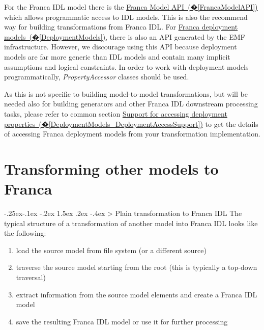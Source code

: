 \documentclass[a4paper,10pt]{scrreprt}
\makeatletter
\renewcommand\subsection{\medskip\@startsection{subsection}{2}{\z@}%
  {-.25ex\@plus -.1ex \@minus -.2ex}%
  {1.5ex \@plus .2ex \@minus -.4ex}%
  {\ifnum \scr@compatibility>\@nameuse{scr@v@2.96}\relax
    \setlength{\parfillskip}{\z@ plus 1fil}\fi
    \raggedsection\normalfont\sectfont\nobreak\size@subsection
  }%
}
\newlength{\XdocItemIndent}
\makeatother
\begin{document}
For the Franca IDL model there is the \hyperref[FrancaModelAPI]{Franca Model API~(�\ref*{FrancaModelAPI})} which allows
programmatic access to IDL models. This is also the recommend way for building transformations
from Franca IDL.
For \hyperref[DeploymentModels]{Franca deployment models~(�\ref*{DeploymentModels})}, there is also an API generated by the
EMF infrastructure. However, we discourage using this API because deployment models are far more
generic than IDL models and contain many implicit assumptions and logical constraints. 
In order to work with deployment models programmatically, \textit{PropertyAccessor} classes
should be used.

As this is not specific to building model-to-model transformations, but will be needed
also for building generators and other Franca IDL downstream processing tasks,
please refer to common section 
\hyperref[DeploymentModels_DeploymentAccessSupport]{Support for accessing deployment properties~(�\ref*{DeploymentModels_DeploymentAccessSupport})}
to get the details of accessing Franca deployment models from your transformation implementation.

\section{Transforming other models to Franca}
\label{BuildingTransformations_XToFranca}
\subsection{Plain transformation to Franca IDL}
\label{BuildingTransformations_XToFranca_Plain}
The typical structure of a transformation of another model into Franca IDL looks
like the following:

\setlength{\XdocItemIndent}{\textwidth}
\begin{enumerate}
\addtolength{\XdocItemIndent}{-2.5em}
\item \begin{minipage}[t]{\XdocItemIndent}
load the source model from file system (or a different source)

\end{minipage}
\item \begin{minipage}[t]{\XdocItemIndent}
traverse the source model starting from the root (this is typically a top-down traversal)

\end{minipage}
\item \begin{minipage}[t]{\XdocItemIndent}
extract information from the source model elements and create a Franca IDL model

\end{minipage}
\item \begin{minipage}[t]{\XdocItemIndent}
save the resulting Franca IDL model or use it for further processing

\end{minipage}
\end{enumerate}
\addtolength{\XdocItemIndent}{2.5em}
\end{document}
